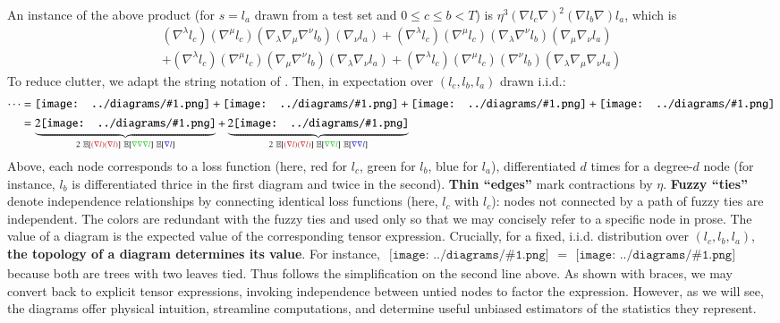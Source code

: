 \documentclass{article}
\newcommand{\expct}[1]{\mathbb{E}\left[#1\right]}
\newcommand{\sdia}[1]{\begin{gathered}\texttt{[image: ../diagrams/\#1.png]}\end{gathered}}
\begin{document}
    An instance of the above product (for $s=l_a$ drawn from a test set and
    $0\leq c\leq b<T$) is
    $\eta^3 (\nabla l_c \nabla)^2 (\nabla l_b \nabla) l_a$, which is
    {\small
    \begin{align*}
          (\nabla^\lambda l_c) (\nabla^\mu l_c) (\nabla_\lambda \nabla_\mu \nabla^\nu l_b) (\nabla_\nu l_a)   
        + (\nabla^\lambda l_c) (\nabla^\mu l_c) (\nabla_\lambda \nabla^\nu l_b) (\nabla_\mu \nabla_\nu l_a) \\
        + (\nabla^\lambda l_c) (\nabla^\mu l_c) (\nabla_\mu \nabla^\nu l_b) (\nabla_\lambda \nabla_\nu l_a)   
        + (\nabla^\lambda l_c) (\nabla^\mu l_c) (\nabla^\nu l_b) (\nabla_\lambda \nabla_\mu \nabla_\nu l_a)
    \end{align*}
    }
    To reduce clutter, we adapt the string notation of \citet{pe71}.  Then, in
    expectation over $(l_c, l_b, l_a)$ drawn i.i.d.:
    \begin{align}
        \cdots
        &= 
             \sdia{(01-2-3)(02-12-23)}
            +\sdia{(01-2-3)(02-13-23)}
            +\sdia{(01-2-3)(03-12-23)}
            +\sdia{(01-2-3)(03-13-23)} \\
        &=
            \underbrace{2\sdia{(01-2-3)(02-12-23)}}_{
                2~\expct{{\color{moor}(\nabla l)(\nabla l)}}~\expct{{\color{moog}\nabla\nabla\nabla l}}~\expct{{\color{moob} \nabla l}}
            }
            +
            \underbrace{2\sdia{(01-2-3)(02-13-23)}}_{
                2~\expct{{\color{moor}(\nabla l)(\nabla l)}}~\expct{{\color{moog}\nabla \nabla l}}~\expct{{\color{moob}\nabla \nabla l}}
            }
    \end{align}
    Above, each node corresponds to a loss function (here, red for $l_c$, green
    for $l_b$, blue for $l_a$), differentiated $d$ times for a degree-$d$ node
    (for instance, $l_b$ is differentiated thrice in the first diagram and
    twice in the second).  {\bf Thin ``edges''} mark contractions by $\eta$.
    {\bf Fuzzy ``ties''} denote independence relationships by connecting
    identical loss functions (here, $l_c$ with $l_c$): nodes not connected by a
    path of fuzzy ties are independent.  The colors are redundant with the
    fuzzy ties and used only so that we may concisely refer to a specific node
    in prose.  The value of a diagram is the expected value of the
    corresponding tensor expression.  Crucially, for a fixed, i.i.d.
    distribution over $(l_c, l_b, l_a)$, {\bf the topology of a diagram
    determines its value}.  For instance, $\sdia{(01-2-3)(02-12-23)} =
    \sdia{(01-2-3)(03-13-23)}$ because both are trees with two leaves tied.
    Thus follows the simplification on the second line above.  As shown with
    braces, we may convert back to explicit tensor expressions, invoking
    independence between untied nodes to factor the expression.  However, as we
    will see, the diagrams offer physical intuition, streamline computations,
    and determine useful unbiased estimators of the statistics they represent.  
\end{document}
